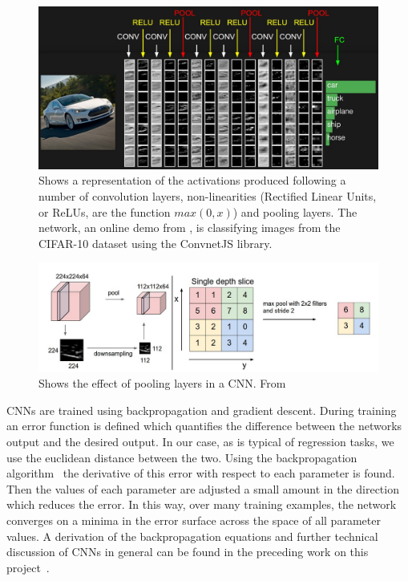 \documentclass[11pt]{article} %
\begin{document}
\begin{figure}
\includegraphics*[width=1\linewidth,clip]{convnet}
\caption{Shows a representation of the activations produced following a number of convolution layers, non-linearities (Rectified Linear Units, or ReLUs, are the function $max(0,x)$) and pooling layers. The network, an online demo from \cite{KarLects}, is classifying images from the CIFAR-10 dataset using the ConvnetJS library\protect\footnotemark.  \label{fig:convnet}  }
\end{figure}

\begin{figure}
\includegraphics*[width=1\linewidth,clip]{pooling}
\caption{Shows the effect of pooling layers in a CNN.  From~\cite{KarLects} \label{fig:pool}  } 
\end{figure}

CNNs are trained using backpropagation and gradient descent. During training an error function is defined which quantifies the difference between the networks output and the desired output. In our case, as is typical of regression tasks, we use the euclidean distance between the two. Using the backpropagation algorithm~\cite{Rumelhart1986} the derivative of this error with respect to each parameter is found.  Then the values of each parameter are adjusted a small amount in the direction which reduces the error. In this way, over many training examples, the network converges on a minima in the error surface across the space of all parameter values.  A derivation of the backpropagation equations and further technical discussion of CNNs in general can be found in the preceding work on this project~\cite{Crabbe2015}.
\end{document}
